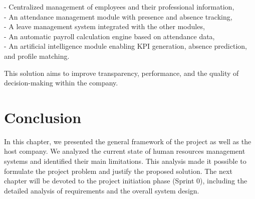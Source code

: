 - Centralized management of employees and their professional information,\\
- An attendance management module with presence and absence tracking,\\
- A leave management system integrated with the other modules,\\
- An automatic payroll calculation engine based on attendance data,\\
- An artificial intelligence module enabling KPI generation, absence prediction, and profile matching.

This solution aims to improve transparency, performance, and the quality of decision-making within the company.

\section*{Conclusion}

In this chapter, we presented the general framework of the project as well as the host company. We analyzed the current state of human resources management systems and identified their main limitations. This analysis made it possible to formulate the project problem and justify the proposed solution. The next chapter will be devoted to the project initiation phase (Sprint 0), including the detailed analysis of requirements and the overall system design.